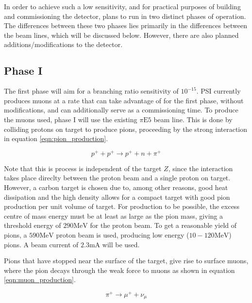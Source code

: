 In order to achieve such a low sensitivity, and for practical purposes of building and commissioning the detector, \mueee plans to run in two distinct phases of operation.
The differences between these two phases lies primarily in the differences between the beam lines, which will be discussed below.
However, there are also planned additions/modifications to the detector.

\subsection{Phase I}
The first phase will aim for a branching ratio sensitivity of $10^{-15}$.
PSI currently produces muons at a rate that \mueee can take advantage of for the first phase, without modifications, and can additionally serve as a commissioning time.
To produce the muons used, phase I will use the existing $\pi\textrm{E5}$ beam line.
This is done by colliding protons on target to produce pions, proceeding by the strong interaction in equation \ref{eqn:pion_production}.

\begin{equation}
\label{eqn:pion_production}
p^+ + p^+ \rightarrow p^+ + n + \pi^+
\end{equation}

\noindent Note that this is process is independent of the target $Z$, since the interaction takes place direclty between the proton beam and a single proton on target.
However, a carbon target is chosen due to, among other reasons, good heat dissipation and the high density allows for a compact target with good pion production per unit volume of target.
For production to be possible, the excess centre of mass energy must be at least as large as the pion mass, giving a threshold energy of $290\textrm{MeV}$ for the proton beam.
To get a reasonable yield of pions, a $590\textrm{MeV}$ proton beam is used, producing low energy ($10-120\textrm{MeV}$) pions.
A beam current of $2.3\textrm{mA}$ will be used.

Pions that have stopped near the surface of the target, give rise to surface muons, where the pion decays through the weak force to muons as shown in equation \ref{eqn:muon_production}.

\begin{equation}
\label{eqn:muon_production}
\pi^+ \rightarrow \mu^+ + \nu_\mu
\end{equation}

